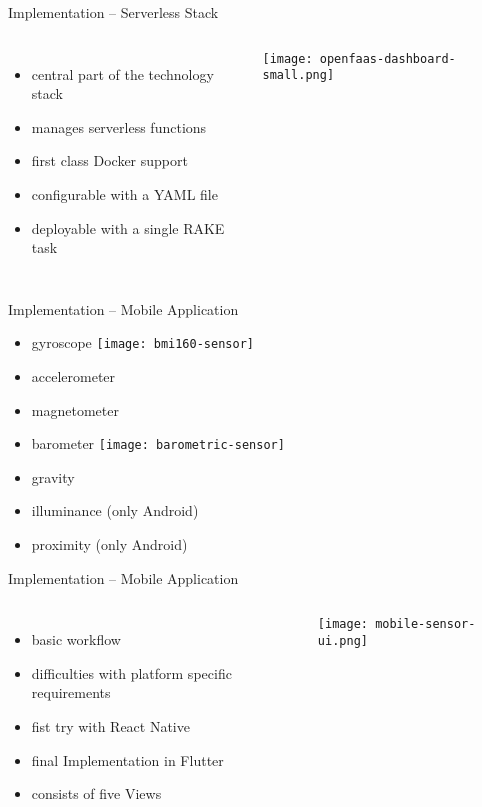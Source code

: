 \documentclass[aspectratio=169]{beamer}
\begin{document}
  \begin{frame}{Implementation -- Serverless Stack}
    \begin{columns}
        \begin{itemize}
          \item central part of the technology stack
          \item manages serverless functions
          \item first class Docker support
          \item configurable with a YAML file
          \item deployable with a single RAKE task
        \end{itemize}
        \vfill
        \centering
        \texttt{[image: openfaas-dashboard-small.png]}
     \end{columns}
  \end{frame}

  

  \begin{frame}{Implementation -- Mobile Application}
    \begin{itemize}
      \item gyroscope
            \hspace*{18.4em}
            \texttt{[image: bmi160-sensor]}
      \item accelerometer
      \item magnetometer
      \item barometer
            \hspace*{18,4em}
            \texttt{[image: barometric-sensor]}
      \item gravity
      \item illuminance (only Android)
      \item proximity (only Android)
    \end{itemize}
  \end{frame}

  \begin{frame}{Implementation -- Mobile Application}
    \begin{columns}
        \begin{itemize}
          \item basic workflow
          \item difficulties with platform specific requirements
          \item fist try with React Native
          \item final Implementation in Flutter
          \item consists of five Views
        \end{itemize}
        \vfill
        \vspace*{2em}
        \centering
        \texttt{[image: mobile-sensor-ui.png]}
     \end{columns}
  \end{frame}
\end{document}

